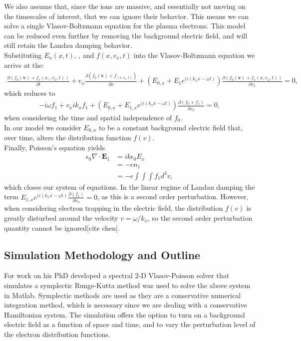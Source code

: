 \documentclass{article}
\begin{document}
We also assume that, since the ions are massive, and essentially not moving on the timescales of interest, that we can ignore their behavior. This means we can solve a single Vlasov-Boltzmann equation for the plasma electrons. This model can be reduced even further by removing the background electric field, and will still retain the Landau damping behavior.\\
Substituting $E_x(x,t)$, , and $f(x,v_x,t)$ into the Vlasov-Boltzmann equation we arrive at the:
\begin{align*}
\frac{\partial(f_0(\textbf{v}) + f_1(x,,v_x,t))}{\partial t} +  v_{x}\frac{\partial( f_0(\textbf{v}) + f_(x,v_x,t))}{\partial x} + (E_{0,x} + E_1e^{(i(k_x x-\omega t)})\frac{\partial(f_0(\textbf{v}) + f_1(x,v_x,t))}{\partial v_x}=0,
\end{align*}
which reduces to
\begin{align*}
-i\omega f_1 +  v_{x}ik_xf_1 + (E_{0,x} + E_{1,x}e^{(i(k_x x-\omega t)})\frac{\partial( f_0 + f_1)}{\partial v_x} =0,
\end{align*}
when considering the time and spatial independence of $f_0$.\\
In our model we consider $E_{0,x}$ to be a constant background electric field that, over time, alters the distribution function $f(v)$.\\
Finally, Poisson's equation yields
\begin{align*}
\epsilon_{0} \nabla \cdot \textbf{E}_1 &= ik \epsilon_0E_x\\
& = -en_1\\
& = -e \int \int \int f_1 d^3 v,
\end{align*}
which closes our system of equations.
In the linear regime of Landau damping the term $E_{1,x}e^{(i(k_x x-\omega t)}\frac{\partial(  f_1)}{\partial v_x}=0$, as this is a second order perturbation. However, when considering electron trapping in the electric field, the distribution $f(v)$ is greatly disturbed around the velocity $v=\omega/k_x$, so the second order perturbation quantity cannot be ignored[cite chen].\\
\subsection{Simulation Methodology and Outline}
For work on his PhD \cite{Ameres}  developed a spectral 2-D Vlasov-Poisson solver that simulates  a symplectic Runge-Kutta method was used to solve the above system in Matlab. Symplectic methods are used as they are a conservative numerical integration method, which is necessary since we are dealing with a conservative Hamiltonian system. The simulation offers the option to turn on a background electric field as a function of space and time, and to vary the perturbation level of the electron distribution functions.\\
\end{document}
